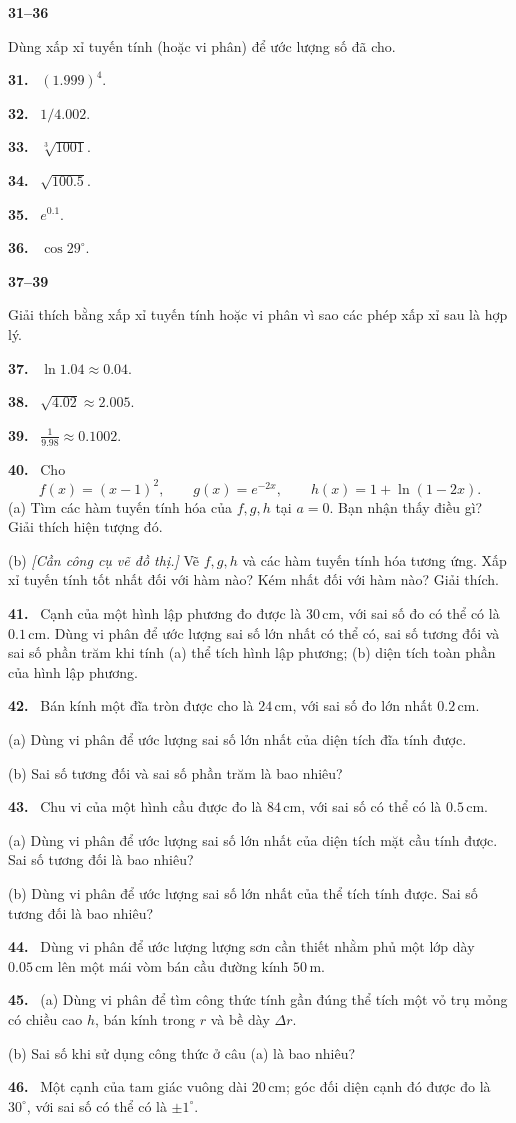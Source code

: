 \documentclass[12pt,a4paper]{article}
\newcommand{\bt}[1]{\par\smallskip\Needspace{5\baselineskip}\noindent\textbf{#1.}\ }
\newcommand{\group}[1]{\par\medskip\noindent\textbf{#1}\par\nopagebreak[4]}
\begin{document}
\group{31–36} Dùng xấp xỉ tuyến tính (hoặc vi phân) để ước lượng số đã cho.
\bt{31} $(1.999)^4$.
\bt{32} $1/4.002$.
\bt{33} $\sqrt[3]{1001}$.
\bt{34} $\sqrt{100.5}$.
\bt{35} $e^{0.1}$.
\bt{36} $\cos29^\circ$.

\group{37–39} Giải thích bằng xấp xỉ tuyến tính hoặc vi phân vì sao các phép xấp xỉ sau là hợp lý.
\bt{37} $\ln1.04\approx0.04$.
\bt{38} $\sqrt{4.02}\approx2.005$.
\bt{39} $\displaystyle\frac{1}{9.98}\approx0.1002$.

\bt{40} Cho
\[f(x)=(x-1)^2,\qquad g(x)=e^{-2x},\qquad h(x)=1+\ln(1-2x).\]
(a) Tìm các hàm tuyến tính hóa của $f,g,h$ tại $a=0$. Bạn nhận thấy điều gì? Giải thích hiện tượng đó.

(b) \textit{[Cần công cụ vẽ đồ thị.]} Vẽ $f,g,h$ và các hàm tuyến tính hóa tương ứng. Xấp xỉ tuyến tính tốt nhất đối với hàm nào? Kém nhất đối với hàm nào? Giải thích.

\bt{41} Cạnh của một hình lập phương đo được là $30\,\mathrm{cm}$, với sai số đo có thể có là $0.1\,\mathrm{cm}$. Dùng vi phân để ước lượng sai số lớn nhất có thể có, sai số tương đối và sai số phần trăm khi tính (a) thể tích hình lập phương; (b) diện tích toàn phần của hình lập phương.

\bt{42} Bán kính một đĩa tròn được cho là $24\,\mathrm{cm}$, với sai số đo lớn nhất $0.2\,\mathrm{cm}$.

(a) Dùng vi phân để ước lượng sai số lớn nhất của diện tích đĩa tính được.

(b) Sai số tương đối và sai số phần trăm là bao nhiêu?

\bt{43} Chu vi của một hình cầu được đo là $84\,\mathrm{cm}$, với sai số có thể có là $0.5\,\mathrm{cm}$.

(a) Dùng vi phân để ước lượng sai số lớn nhất của diện tích mặt cầu tính được. Sai số tương đối là bao nhiêu?

(b) Dùng vi phân để ước lượng sai số lớn nhất của thể tích tính được. Sai số tương đối là bao nhiêu?

\bt{44} Dùng vi phân để ước lượng lượng sơn cần thiết nhằm phủ một lớp dày $0.05\,\mathrm{cm}$ lên một mái vòm bán cầu đường kính $50\,\mathrm{m}$.

\bt{45} (a) Dùng vi phân để tìm công thức tính gần đúng thể tích một vỏ trụ mỏng có chiều cao $h$, bán kính trong $r$ và bề dày $\Delta r$.

(b) Sai số khi sử dụng công thức ở câu (a) là bao nhiêu?

\bt{46} Một cạnh của tam giác vuông dài $20\,\mathrm{cm}$; góc đối diện cạnh đó được đo là $30^\circ$, với sai số có thể có là $\pm1^\circ$.
\end{document}
